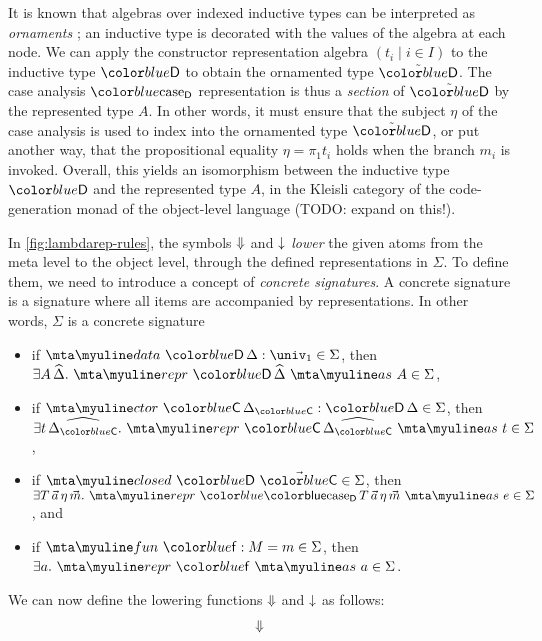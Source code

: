 It is known that algebras over indexed inductive types can be interpreted as
\emph{ornaments} \cite{Dagand2017-nj}; an inductive type is decorated with the
values of the algebra at each node. We can apply the constructor representation
algebra $(t_i \mid i \in I)$ to the inductive type $\lab{D}$ to obtain the
ornamented type $\tilde{\lab{D}}$. The case analysis $\caselab{D}$
representation is thus a \emph{section} of $\tilde{\lab{D}}$ by the represented
type $A$. In other words, it must ensure that the subject $\eta$ of the case
analysis is used to index into the ornamented type $\tilde{\lab{D}}$, or put
another way, that the propositional equality $\eta = \pi_1 t_i$ holds when the
branch $m_i$ is invoked. Overall, this yields an isomorphism between the
inductive type $\lab{D}$ and the represented type $A$, in the Kleisli category
of the code-generation monad of the object-level language (TODO: expand on
this!).

In \cref{fig:lambdarep-rules}, the symbols $\text{$\Downarrow$} {}$ and $\text{$\downarrow$} {}$
\emph{lower} the given atoms from the meta level to the object level, through
the defined representations in $\Sigma$. To define them, we need to introduce a
concept of \emph{concrete signatures}. A concrete signature is a signature
where all items are accompanied by representations. In other words, $\Sigma$ is
a concrete signature
\begin{itemize}
  \item if $\Sdata{D}{\Delta} \in \Sigma$, then $\exists A \, \widehat{\Delta} .\
          \Srepr{R}{D}{\widehat{\Delta}}{A} \in \Sigma$,
  \item if $\Sctorvar{\lab{C}}{\Delta_{\lab{C}}}{D}{\Delta} \in \Sigma$, then $\exists
          t\,\widehat{\Delta_\lab{C}} .\
          \Sreprvar{R}{\lab{C}}{\widehat{\Delta_{\lab{C}}}}{t} \in \Sigma$,
  \item if $\Sclosed{\lab{D}}{\vec{\lab{C}}} \in \Sigma$, then $\exists
          T\,\vec{a}\,\eta\,\vec{m} .\ \Srepr{R}{\caselab{D}}{T\,\vec{a}\,\eta\,\vec{m}
          }{e} \in \Sigma$, and
  \item if $\Sfun{f}{M}{m} \in \Sigma$, then $\exists a .\ \Sreprconst{R}{f}{a} \in
          \Sigma$.
\end{itemize}
We can now define the lowering functions $\text{$\Downarrow$} {}$ and $\text{$\downarrow$} {}$ as follows:
\begin{align*}
  \text{$\Downarrow$} {}
\end{align*}
